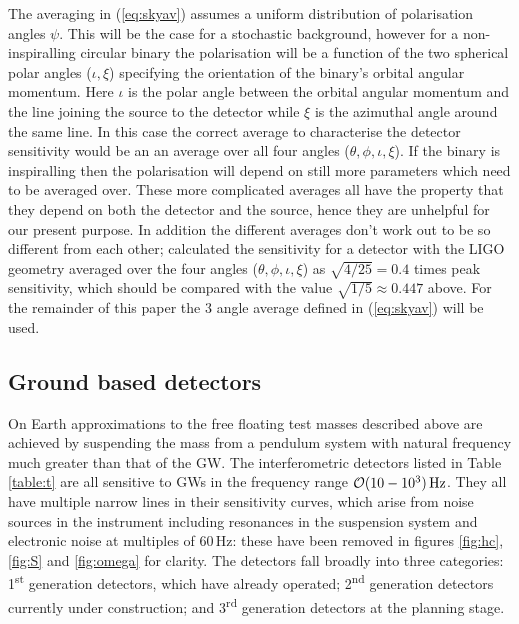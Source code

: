 The averaging in (\ref{eq:skyav}) assumes a uniform distribution of polarisation angles $\psi$. This will be the case for a stochastic background, however for a non-inspiralling circular binary the polarisation will be a function of the two spherical polar angles ($\iota,\xi$) specifying the orientation of the binary's orbital angular momentum. Here $\iota$ is the polar angle between the orbital angular momentum and the line joining the source to the detector while $\xi$ is the azimuthal angle around the same line. In this case the correct average to characterise the detector sensitivity would be an an average over all four angles ($\theta,\phi,\iota,\xi$). If the binary is inspiralling then the polarisation will depend on still more parameters which need to be averaged over. These more complicated averages all have the property that they depend on both the detector and the source, hence they are unhelpful for our present purpose. In addition the different averages don't work out to be so different from each other; \cite{1993PhRvD..47.2198F} calculated the sensitivity for a detector with the LIGO geometry averaged over the four angles ($\theta,\phi,\iota,\xi$) as $\sqrt{4/25}=0.4$ times peak sensitivity, which should be compared with the value $\sqrt{1/5}\approx 0.447$ above. For the remainder of this paper the 3 angle average defined in (\ref{eq:skyav}) will be used.

\subsection{Ground based detectors}\label{sec:ground}
On Earth approximations to the free floating test masses described above are achieved by suspending the mass from a pendulum system with natural frequency much greater than that of the GW. The interferometric detectors listed in Table \ref{table:t} are all sensitive to GWs in the frequency range ${\cal{O}}(10-10^{3})\,\textrm{Hz}$. They all have multiple narrow lines in their sensitivity curves, which arise from noise sources in the instrument including resonances in the suspension system and electronic noise at multiples of $60\,\textrm{Hz}$: these have been removed in figures \ref{fig:hc}, \ref{fig:S} and \ref{fig:omega} for clarity. The detectors fall broadly into three categories: 1\textsuperscript{st} generation detectors, which have already operated; 2\textsuperscript{nd} generation detectors currently under construction; and 3\textsuperscript{rd} generation detectors at the planning stage. 

